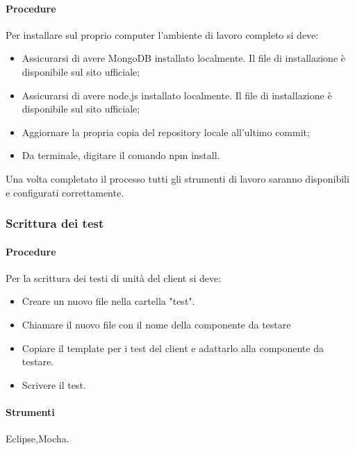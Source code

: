 \paragraph{Procedure}
Per installare sul proprio computer l'ambiente di lavoro completo si deve:

\begin{itemize}
\item Assicurarsi di avere MongoDB installato localmente. Il file di installazione è disponibile sul sito ufficiale;
\item Assicurarsi di avere node.js installato localmente.  Il file di installazione è disponibile sul sito ufficiale;
\item Aggiornare la propria copia del repository locale all'ultimo commit;
\item Da terminale, digitare il comando \glqq npm install\grqq.%
\end{itemize}

Una volta completato il processo tutti gli strumenti di lavoro saranno disponibili e configurati correttamente.


\subsubsection{Scrittura dei test}

\paragraph{Procedure}
Per la scrittura dei testi di unità del client si deve:

\begin{itemize}
\item Creare un nuovo file nella cartella "test".
\item Chiamare il nuovo file con il nome della componente da testare
\item Copiare il template per i test del client e adattarlo alla componente da testare.
\item Scrivere il test.
\end{itemize}



\paragraph{Strumenti}

Eclipse,Mocha.


